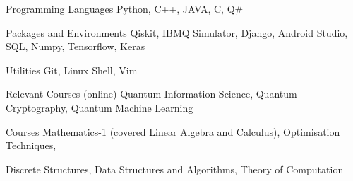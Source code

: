

\begin{cvskills}

  \cvskill
    {Programming Languages} %
    {Python, C++, JAVA, C, Q#} %

  \cvskill
    {Packages and Environments} %
    {Qiskit, IBMQ Simulator, Django, Android Studio, SQL, Numpy, Tensorflow, Keras} %
    

  \cvskill
    {Utilities} %
    {Git, Linux Shell, Vim} %


  \cvskill
    {Relevant Courses (online)} %
    {Quantum Information Science, Quantum Cryptography, Quantum Machine Learning} %

    
  \cvskill
    {Courses}
    {Mathematics-1 (covered Linear Algebra and Calculus), Optimisation Techniques,} 
    
  \cvskill
  {}
  {Discrete Structures, Data Structures and Algorithms, Theory of Computation}
\end{cvskills}

